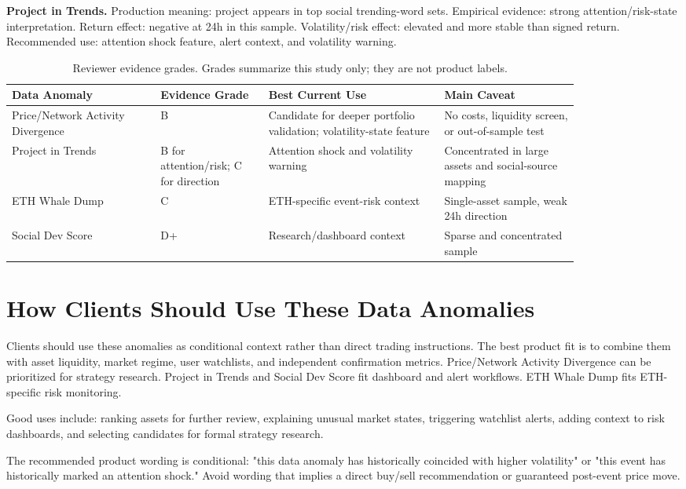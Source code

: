 \documentclass[11pt]{article}
\begin{document}
\textbf{Project in Trends.} Production meaning: project appears in top social trending-word sets. Empirical evidence: strong attention/risk-state interpretation. Return effect: negative at 24h in this sample. Volatility/risk effect: elevated and more stable than signed return. Recommended use: attention shock feature, alert context, and volatility warning.

\begin{table}[H]
\centering
\small
\caption{Reviewer evidence grades. Grades summarize this study only; they are not product labels.}
\begin{tabular}{L{0.22\linewidth}L{0.16\linewidth}L{0.26\linewidth}L{0.20\linewidth}}
\toprule
Data Anomaly & Evidence Grade & Best Current Use & Main Caveat \\
\midrule
Price/Network Activity Divergence & B & Candidate for deeper portfolio validation; volatility-state feature & No costs, liquidity screen, or out-of-sample test \\
Project in Trends & B for attention/risk; C for direction & Attention shock and volatility warning & Concentrated in large assets and social-source mapping \\
ETH Whale Dump & C & ETH-specific event-risk context & Single-asset sample, weak 24h direction \\
Social Dev Score & D+ & Research/dashboard context & Sparse and concentrated sample \\
\bottomrule
\end{tabular}
\end{table}

\section{How Clients Should Use These Data Anomalies}
Clients should use these anomalies as conditional context rather than direct trading instructions. The best product fit is to combine them with asset liquidity, market regime, user watchlists, and independent confirmation metrics. Price/Network Activity Divergence can be prioritized for strategy research. Project in Trends and Social Dev Score fit dashboard and alert workflows. ETH Whale Dump fits ETH-specific risk monitoring.

Good uses include: ranking assets for further review, explaining unusual market states, triggering watchlist alerts, adding context to risk dashboards, and selecting candidates for formal strategy research.

The recommended product wording is conditional: "this data anomaly has historically coincided with higher volatility" or "this event has historically marked an attention shock." Avoid wording that implies a direct buy/sell recommendation or guaranteed post-event price move.
\end{document}
